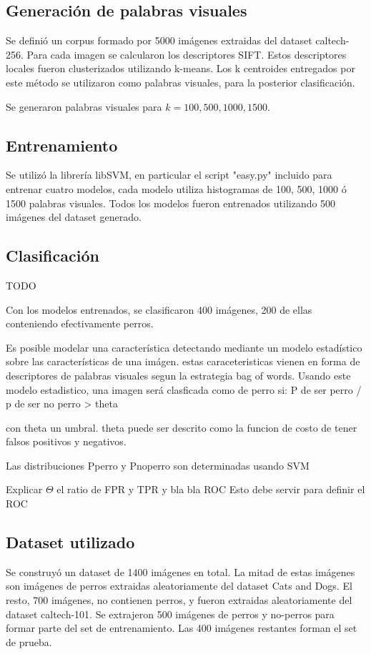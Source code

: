 \documentclass[12pt]{article}
\begin{document}
\subsection{Generación de palabras visuales}

Se definió un corpus formado por 5000 imágenes extraidas del dataset caltech-256. Para cada imagen se calcularon los descriptores SIFT.
Estos descriptores locales fueron clusterizados utilizando k-means. Los k centroides entregados por este método se utilizaron como
palabras visuales, para la posterior clasificación.

Se generaron palabras visuales para $k = 100, 500, 1000, 1500$.

\subsection{Entrenamiento}

Se utilizó la librería libSVM, en particular el script "easy.py" incluido para entrenar cuatro modelos, cada modelo utiliza histogramas de 100, 500, 1000 ó 1500
palabras visuales. Todos los modelos fueron entrenados utilizando 500 imágenes del dataset generado.

\subsection{Clasificación}

TODO

Con los modelos entrenados, se clasificaron 400 imágenes, 200 de ellas conteniendo efectivamente perros.

Es posible modelar una característica detectando mediante un modelo estadístico sobre las características de una imágen. estas caraceteristicas vienen en forma de descriptores de palabras visuales segun la estrategia bag of words.
Usando este modelo estadistico, una imagen será clasficada como de perro si:
P de ser perro / p de ser no perro > theta

con theta un umbral.
theta puede ser descrito como la funcion de costo de tener falsos positivos y negativos.

Las distribuciones Pperro y Pnoperro son determinadas usando SVM

Explicar $\Theta$ el ratio de FPR y TPR y bla bla ROC
Esto debe servir para definir el ROC

\subsection{Dataset utilizado}
Se construyó un dataset de 1400 imágenes en total. La mitad de estas imágenes son imágenes de perros extraidas aleatoriamente del dataset Cats and Dogs. 
El resto, 700 imágenes, no contienen perros, y fueron extraidas aleatoriamente del dataset caltech-101.
Se extrajeron 500 imágenes de perros y no-perros para formar parte del set de entrenamiento.
Las 400 imágenes restantes forman el set de prueba.
\end{document}
